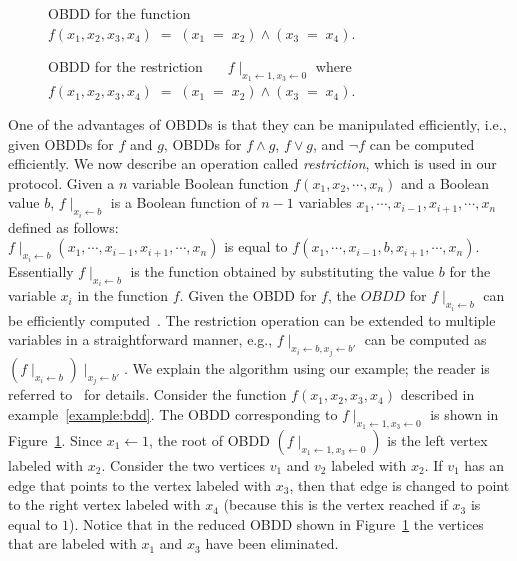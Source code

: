 \begin{figure}
\begin{minipage}{3in}
\centering
{}
\caption{OBDD for the function $f(x_1,x_2,x_3, x_4) \; = \; (x_1 \; = \; x_2) \wedge (x_3 \; = \;
x_4)$.}
\label{fig:OBDD}
\end{minipage}
\hfill
\begin{minipage}{3in}
\centering
{}
\caption{OBDD for the restriction $\;\;\;\;$ $f\mid_{x_1 \leftarrow 1, x_3 \leftarrow 0}$ where
 $f(x_1,x_2,x_3, x_4) \; = \; (x_1 \; = \; x_2) \wedge (x_3 \; = \; x_4)$.}
\label{fig:OBDD-reduced}
\end{minipage}
\end{figure}


One of the advantages of OBDDs is that they can be manipulated
efficiently, i.e., given OBDDs for $f$ and $g$, OBDDs for $f \wedge
g$, $f \vee g$, and $\neg f$ can be computed efficiently. We now
describe an operation called {\it restriction}, which is used in our
protocol.  Given a $n$ variable Boolean function
$f(x_1,x_2,\cdots,x_n)$ and a Boolean value $b$, $f
\mid_{x_i \leftarrow b}$ is a Boolean function of $n-1$ variables
$x_1, \cdots, x_{i-1},x_{i+1},\cdots,x_n$ defined as follows:\\
$f \mid_{x_i \leftarrow b} (x_1, \cdots, x_{i-1},x_{i+1},\cdots,x_n)$ is
equal to $f(x_1, \cdots, x_{i-1},b,x_{i+1},\cdots,x_n)$.
Essentially $f \mid_{x_i \leftarrow b}$ is the function obtained by substituting
the value $b$ for the variable $x_i$ in the function $f$. 
Given the OBDD for $f$, the $OBDD$ for $f \mid_{x_i \leftarrow b}$ can
be efficiently computed~\cite[Section 4]{Bryant:BDD}.  The restriction
operation can be extended to multiple variables in a
straightforward manner, e.g., $f \mid_{x_i \leftarrow b, x_j \leftarrow b'}$
can be computed as $(f \mid_{x_i \leftarrow b}) \mid_{x_j \leftarrow b'}$. We
explain the algorithm using our example; the reader is referred to~\cite{Bryant:BDD}
for details. 
Consider the function $f(x_1,x_2,x_3,x_4)$
described in example~\ref{example:bdd}. The OBDD corresponding to $f
\mid_{x_1 \leftarrow 1, x_3 \leftarrow 0}$ is shown in
Figure~\ref{fig:OBDD-reduced}.  
Since $x_1 \leftarrow 1$, the root of OBDD $(f\mid_{x_1 \leftarrow 1, x_3 \leftarrow 0})$
is the left vertex labeled with $x_2$. Consider the two vertices $v_1$
and $v_2$ labeled with $x_2$. If $v_1$ has an edge that points to the vertex labeled with $x_3$, then
that edge is changed to point to the right vertex labeled with $x_4$ (because this is the vertex
reached if $x_3$ is equal to $1$). 
Notice that in the reduced OBDD shown in Figure~\ref{fig:OBDD-reduced}
the vertices that are labeled with $x_1$ and $x_3$ have been eliminated. 

